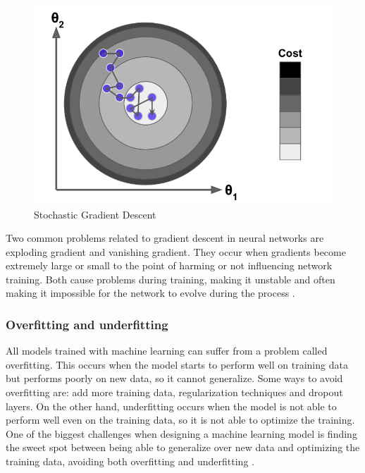 \documentclass[a4paper,fleqn]{cas-sc}
\begin{document}
\begin{figure}[h!]
	\caption{Stochastic Gradient Descent}
	\label{fig:sgd}
	\centering%
	\begin{minipage}{.6\textwidth}
		\includegraphics[width=\textwidth]{images/geron_sgd.png}
	\end{minipage}
\end{figure}

Two common problems related to gradient descent in neural networks are exploding gradient and vanishing gradient. They occur when gradients become extremely large or small to the point of harming or not influencing network training. Both cause problems during training, making it unstable and often making it impossible for the network to evolve during the process \cite{aggarwal2018, geron2019hands}.

\subsubsection{Overfitting and underfitting}
All models trained with machine learning can suffer from a problem called overfitting. This occurs when the model starts to perform well on training data but performs poorly on new data, so it cannot generalize. Some ways to avoid overfitting are: add more training data, regularization techniques and dropout layers. On the other hand, underfitting occurs when the model is not able to perform well even on the training data, so it is not able to optimize the training. One of the biggest challenges when designing a machine learning model is finding the sweet spot between being able to generalize over new data and optimizing the training data, avoiding both overfitting and underfitting \cite{chollet2017deep}.
\end{document}

